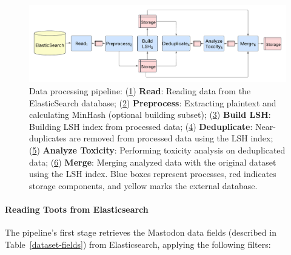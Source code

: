 \begin{figure}[tb]
    \centering
    \includegraphics[width=\textwidth]{../material/pipeline.png}
    \caption{Data processing pipeline: 
    (\hyperref[step:reading]{1}) \textbf{Read}: Reading data from the ElasticSearch database; 
    (\hyperref[step:preprocess]{2}) \textbf{Preprocess}: Extracting plaintext and calculating MinHash (optional building subset); 
    (\hyperref[step:lsh]{3}) \textbf{Build LSH}: Building LSH index from processed data; 
    (\hyperref[step:dedup]{4}) \textbf{Deduplicate}: Near-duplicates are removed from processed data using the LSH index; 
    (\hyperref[step:toxicity]{5}) \textbf{Analyze Toxicity}: Performing toxicity analysis on deduplicated data; 
    (\hyperref[step:merge]{6}) \textbf{Merge}: Merging analyzed data with the original dataset using the LSH index. 
    Blue boxes represent processes, red indicates storage components, and yellow marks the external database.}
    \label{fig:pipeline}
\end{figure}

\paragraph{Reading Toots from Elasticsearch}\label{step:reading}
The pipeline's first stage retrieves the Mastodon data fields (described in Table~\ref{dataset-fields}) from Elasticsearch, applying the following filters:

